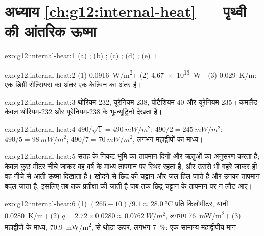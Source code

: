 \section*{अध्याय \ref{ch:g12:internal-heat} --- पृथ्वी की आंतरिक ऊष्मा}

\begin{solution}{exo:g12:internal-heat:1}
(a) ; (b) ; (c) ;
(d) ; (e) ।
\end{solution}

\begin{solution}{exo:g12:internal-heat:2}
(1) \qty{0.0916}{W/m^2}। (2) \qty{4.67e13}{W}। (3) \qty{0.029}{K/m}: एक
डिग्री सेल्सियस का अंतर एक केल्विन का अंतर है।
\end{solution}

\begin{solution}{exo:g12:internal-heat:3}
थोरियम-232, यूरेनियम-238, पोटैशियम-40 और यूरेनियम-235। कमलैंड केवल
थोरियम-232 और यूरेनियम-238 के भू-न्यूट्रिनो देखता है।
\end{solution}

\begin{solution}{exo:g12:internal-heat:4}
$490/\sqrt{1} = \qty{490}{mW/m^2}$; $490/2 = \qty{245}{mW/m^2}$;
$490/5 = \qty{98}{mW/m^2}$; $490/7 = \qty{70}{mW/m^2}$, लगभग महाद्वीपों का
माध्य।
\end{solution}

\begin{solution}{exo:g12:internal-heat:5}
सतह के निकट भूमि का तापमान दिनों और ऋतुओं का अनुसरण करता है;
केवल कुछ मीटर नीचे जाकर वह वर्ष के माध्य तापमान पर स्थिर रहता है, और उससे भी
गहरे जाकर ही वह नीचे से आती ऊष्मा दिखाता है।
खोदने से छिद्र की चट्टान और जल हिल जाते हैं और उनका तापमान बदल जाता है,
इसलिए तब तक प्रतीक्षा की जाती है जब तक छिद्र चट्टान के तापमान पर
न लौट आए।
\end{solution}

\begin{solution}{exo:g12:internal-heat:6}
(1) $(265 - 10)/9.1 \approx \qty{28.0}{\celsius}$ प्रति किलोमीटर, यानी
\qty{0.0280}{K/m}। (2) $q = 2.72 \times 0.0280 \approx \qty{0.0762}{W/m^2}$,
लगभग \qty{76}{mW/m^2}। (3) महाद्वीपों के माध्य,
\qty{70.9}{mW/m^2}, से थोड़ा ऊपर, लगभग \qty{7}{\percent}: एक सामान्य महाद्वीपीय मान।
\end{solution}

